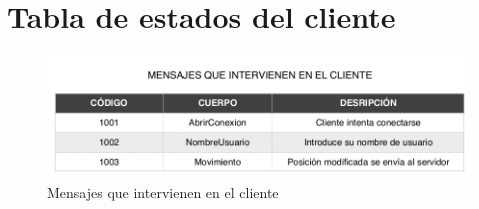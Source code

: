 \section{Tabla de estados del cliente}	

\begin{figure}[h]
	\centering
	\includegraphics[width=.8\textwidth]{img/2}
	\caption{Mensajes que intervienen en el cliente}
\end{figure}














